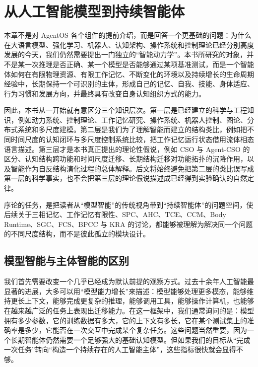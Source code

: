 \chapter{从人工智能模型到持续智能体}

\begin{chapterlead}
本章不是对 AgentOS 各个组件的提前介绍，而是回答一个更基础的问题：为什么在大语言模型、强化学习、机器人、认知架构、操作系统和控制理论已经分别高度发展的今天，我们仍然需要提出一门独立的“智能动力学”。本书所研究的对象，并不是某一次推理是否正确、某一个模型是否能够通过某项基准测试，而是一个智能体如何在有限物理资源、有限工作记忆、不断变化的环境以及持续增长的生命周期经验中，长期保持一个可识别的主体，形成自己的记忆、自我、技能、身体适应、行为习惯和发展方向，并最终具有改变自身认知组织方式的能力。

因此，本书从一开始就有意区分三个知识层次。第一层是已经建立的科学与工程知识，例如动力系统、控制理论、工作记忆研究、操作系统、机器人控制、图论、分布式系统和多尺度建模。第二层是我们为了理解智能而建立的结构类比，例如把不同时间尺度的认知闭环与多尺度控制系统比较，把工作记忆运行状态借用流体相态语言描述。第三层才是本书真正提出的理论性假说，例如 CSO 与 Agent-CSO 的区分、认知结构跨功能和时间尺度迁移、长期结构迁移对功能拓扑的沉降作用，以及智能作为自反结构演化过程的总体解释。后文将始终避免把第二层的类比误写成第一层的科学事实，也不会把第三层的理论假说描述成已经得到实验确认的自然定律。

序论的任务，是把读者从“模型智能”的传统视角带到“持续智能体”的问题空间，使后续关于三相记忆、工作记忆有限性、SPC、AHC、TCE、CCM、Body Runtime、SGC、FCS、BPCC 与 KRA 的讨论，都能够被理解为解决同一个问题的不同尺度结构，而不是彼此孤立的模块设计。
\end{chapterlead}

\section{模型智能与主体智能的区别}

我们首先需要改变一个几乎已经成为默认前提的观察方式。过去十余年人工智能最显著的进展，大多可以用“模型能力增长”来描述：模型能够处理更多模态，能够维持更长上下文，能够完成更复杂的推理，能够调用工具，能够操作计算机，也能够在越来越广泛的任务上表现出迁移能力。在这一框架中，我们通常询问的是：模型拥有多少参数，它的训练数据有多大，它的上下文有多长，它在某个测试集上的准确率是多少，它能否在一次交互中完成某个复杂任务。这些问题当然重要，因为一个长期智能体仍然需要一个足够强大的基础认知模型。但如果我们的目标从“完成一次任务”转向“构造一个持续存在的人工智能主体”，这些指标很快就会显得不够。

